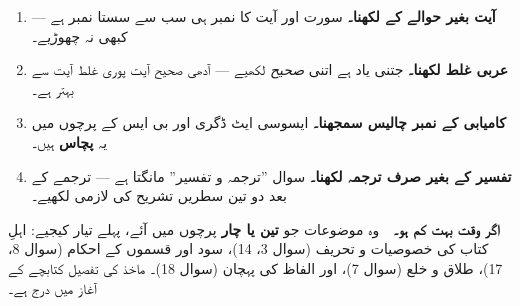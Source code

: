 \begin{enumerate}\setlength{\itemsep}{3pt}
  \item \textbf{آیت بغیر حوالے کے لکھنا۔} سورت اور آیت کا نمبر ہی سب سے سستا
        نمبر ہے --- کبھی نہ چھوڑیے۔
  \item \textbf{عربی غلط لکھنا۔} جتنی یاد ہے اتنی \emph{صحیح} لکھیے --- آدھی
        صحیح آیت پوری غلط آیت سے بہتر ہے۔
  \item \textbf{کامیابی کے نمبر چالیس سمجھنا۔} ایسوسی ایٹ ڈگری اور بی ایس کے
        پرچوں میں یہ \textbf{پچاس} ہیں۔
  \item \textbf{تفسیر کے بغیر صرف ترجمہ لکھنا۔} سوال ''ترجمہ و تفسیر'' مانگتا
        ہے --- ترجمے کے بعد دو تین سطریں تشریح کی لازمی لکھیے۔
\end{enumerate}

\medskip
\noindent
\textbf{\color{bmblue}اگر وقت بہت کم ہو۔}\ \
وہ موضوعات جو \textbf{تین یا چار} پرچوں میں آئے، پہلے تیار کیجیے: اہلِ کتاب
کی خصوصیات و تحریف (سوال \textenglish{3}، \textenglish{14})، سود اور قسموں
کے احکام (سوال \textenglish{8}، \textenglish{17})، طلاق و خلع (سوال
\textenglish{7})، اور الفاظ کی پہچان (سوال \textenglish{18})۔ ماخذ کی تفصیل
کتابچے کے آغاز میں درج ہے۔

